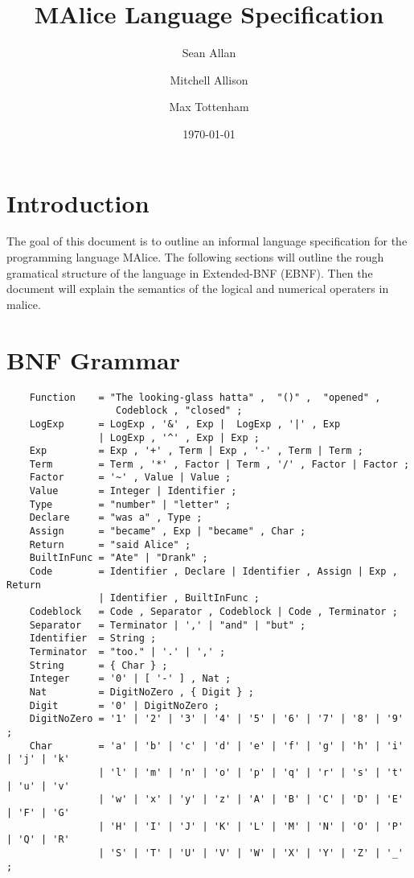 \documentclass[a4wide, 10pt]{article}
\begin{document}
\title{MAlice Language Specification}

\author{Sean Allan \and Mitchell Allison \and Max Tottenham}

\date{\today}         %

\maketitle            %

\section{Introduction}
The goal of this document is to outline an informal language specification for 
the programming language MAlice. The following sections will outline the rough
gramatical structure of the language in Extended-BNF (EBNF). Then the 
document will explain the semantics of the logical and numerical operaters in malice.
\section{BNF Grammar} 
\begin{verbatim}
    Function    = "The looking-glass hatta" ,  "()" ,  "opened" , 
                   Codeblock , "closed" ;
    LogExp      = LogExp , '&' , Exp |  LogExp , '|' , Exp 
                | LogExp , '^' , Exp | Exp ;
    Exp         = Exp , '+' , Term | Exp , '-' , Term | Term ;
    Term        = Term , '*' , Factor | Term , '/' , Factor | Factor ;
    Factor      = '~' , Value | Value ;
    Value       = Integer | Identifier ;
    Type        = "number" | "letter" ;
    Declare     = "was a" , Type ;
    Assign      = "became" , Exp | "became" , Char ;
    Return      = "said Alice" ;
    BuiltInFunc = "Ate" | "Drank" ;
    Code        = Identifier , Declare | Identifier , Assign | Exp , Return  
                | Identifier , BuiltInFunc ;
    Codeblock   = Code , Separator , Codeblock | Code , Terminator ; 
    Separator   = Terminator | ',' | "and" | "but" ; 
    Identifier  = String ;
    Terminator  = "too." | '.' | ',' ;
    String      = { Char } ;
    Integer     = '0' | [ '-' ] , Nat ;
    Nat         = DigitNoZero , { Digit } ;
    Digit       = '0' | DigitNoZero ; 
    DigitNoZero = '1' | '2' | '3' | '4' | '5' | '6' | '7' | '8' | '9' ;
    Char        = 'a' | 'b' | 'c' | 'd' | 'e' | 'f' | 'g' | 'h' | 'i' | 'j' | 'k' 
                | 'l' | 'm' | 'n' | 'o' | 'p' | 'q' | 'r' | 's' | 't' | 'u' | 'v'
                | 'w' | 'x' | 'y' | 'z' | 'A' | 'B' | 'C' | 'D' | 'E' | 'F' | 'G'
                | 'H' | 'I' | 'J' | 'K' | 'L' | 'M' | 'N' | 'O' | 'P' | 'Q' | 'R'
                | 'S' | 'T' | 'U' | 'V' | 'W' | 'X' | 'Y' | 'Z' | '_' ;
\end{verbatim}
\end{document}
